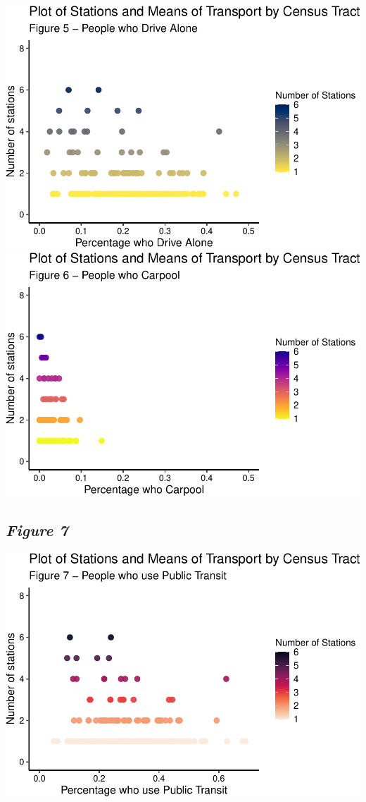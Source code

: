 \documentclass[
  12pt,
]{article}
\begin{document}
\begin{longtable}[]
\includegraphics{Project_Template_files/figure-latex/data scatterplots driv_ln-1.pdf}
\includegraphics{Project_Template_files/figure-latex/data scatterplots driv_ln-2.pdf}

\hypertarget{figure-7}{%
\subsection{\texorpdfstring{\emph{Figure 7}}{Figure 7}}\label{figure-7}}

\includegraphics{Project_Template_files/figure-latex/data scatterplots pr_pblc-1.pdf}


\end{longtable}
\end{document}
